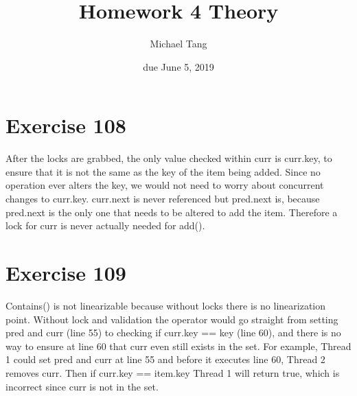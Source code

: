 \documentclass{article}
\title{Homework 4 Theory}
\author{Michael Tang}
\date{due June 5, 2019}
\begin{document}
\maketitle
\begin{adjustwidth}{-2cm}{-2cm}
\section{Exercise 108}
After the locks are grabbed, the only value checked within curr is curr.key, to ensure that it is not the same as the key of the item being added. Since no operation ever alters the key, we would not need to worry about concurrent changes to curr.key. curr.next is never referenced but pred.next is, because pred.next is the only one that needs to be altered to add the item. Therefore a lock for curr is never actually needed for add().
\section{Exercise 109}
Contains() is not linearizable because without locks there is no linearization point. Without lock and validation the operator would go straight from setting pred and curr (line 55) to checking if curr.key == key (line 60), and there is no way to ensure at line 60 that curr even still exists in the set. For example, Thread 1 could set pred and curr at line 55 and before it executes line 60, Thread 2 removes curr. Then if curr.key == item.key Thread 1 will return true, which is incorrect since curr is not in the set.

\end{adjustwidth}
\end{document}
